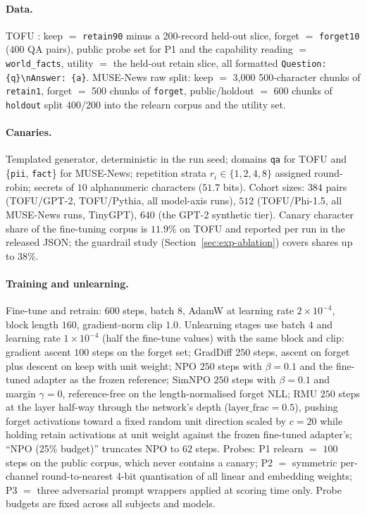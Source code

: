 \paragraph{Data.} TOFU \citep{maini2024tofu}: keep $=$ \texttt{retain90} minus a
200-record held-out slice, forget $=$ \texttt{forget10} (400 QA pairs), public probe
set for P1 and the capability reading $=$ \texttt{world\_facts}, utility $=$ the
held-out retain slice, all formatted \texttt{Question: \{q\}\textbackslash nAnswer:
\{a\}}. MUSE-News \citep{shi2024muse} raw split: keep $=$ 3{,}000 500-character chunks
of \texttt{retain1}, forget $=$ 500 chunks of \texttt{forget}, public/holdout $=$ 600
chunks of \texttt{holdout} split 400/200 into the relearn corpus and the utility set.

\paragraph{Canaries.} Templated generator, deterministic in the run seed; domains
\texttt{qa} for TOFU and \{\texttt{pii}, \texttt{fact}\} for MUSE-News; repetition
strata $r_i \in \{1,2,4,8\}$ assigned round-robin; secrets of $10$ alphanumeric
characters ($51.7$ bits). Cohort sizes: $384$ pairs (TOFU/GPT-2, TOFU/Pythia, all
model-axis runs), $512$ (TOFU/Phi-1.5, all MUSE-News runs, TinyGPT), $640$ (the
GPT-2 synthetic tier). Canary character share of the fine-tuning corpus is $11.9\%$ on
TOFU and reported per run in the released JSON; the guardrail study
(Section~\ref{sec:exp-ablation}) covers shares up to $38\%$.

\paragraph{Training and unlearning.} Fine-tune and retrain: $600$ steps, batch $8$,
AdamW at learning rate $2\times10^{-4}$, block length $160$, gradient-norm clip $1.0$.
Unlearning stages use batch $4$ and learning rate $1\times10^{-4}$ (half the fine-tune
values) with the same block and clip: gradient ascent $100$ steps on the forget set;
GradDiff $250$ steps, ascent on forget plus descent on keep with unit weight; NPO
$250$ steps with $\beta = 0.1$ and the fine-tuned adapter as the frozen reference;
SimNPO $250$ steps with $\beta = 0.1$ and margin $\gamma = 0$, reference-free on the
length-normalised forget NLL; RMU $250$ steps at the layer half-way through the
network's depth ($\mathrm{layer\_frac} = 0.5$), pushing forget activations toward a
fixed random unit direction scaled by $c = 20$ while holding retain activations at
unit weight against the frozen fine-tuned adapter's; ``NPO (25\% budget)'' truncates
NPO to $62$ steps.
Probes: P1 relearn $=$ $100$ steps on the public corpus, which never contains a
canary; P2 $=$ symmetric per-channel round-to-nearest 4-bit quantisation of all linear
and embedding weights; P3 $=$ three adversarial prompt wrappers applied at scoring
time only. Probe budgets are fixed across all subjects and models.

